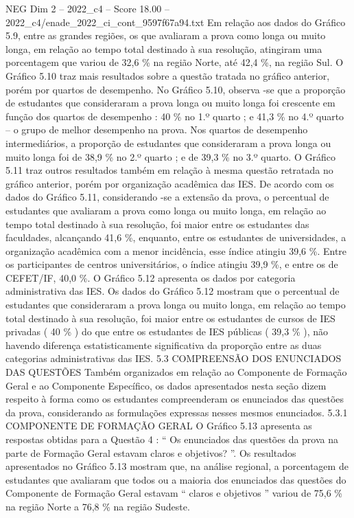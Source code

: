 \begin{textsample}{NEG Dim 2 – 2022\_c4 – Score 18.00 – 2022\_c4/enade\_2022\_ci\_cont\_9597f67a94.txt}
Em relação aos dados do Gráfico 5.9, entre as grandes regiões, os que avaliaram a prova como longa ou muito longa, em relação ao tempo total destinado à sua resolução, atingiram uma porcentagem que variou de 32,6 \% na região Norte, até 42,4 \%, na região Sul.
O Gráfico 5.10 traz mais resultados sobre a questão tratada no gráfico anterior, porém por quartos de desempenho.
No Gráfico 5.10, observa -se que a proporção de estudantes que consideraram a prova longa ou muito longa foi crescente em função dos quartos de desempenho : 40 \% no 1.º quarto ; e 41,3 \% no 4.º quarto – o grupo de melhor desempenho na prova.
Nos quartos de desempenho intermediários, a proporção de estudantes que consideraram a prova longa ou muito longa foi de 38,9 \% no 2.º quarto ; e de 39,3 \% no 3.º quarto.
O Gráfico 5.11 traz outros resultados também em relação à mesma questão retratada no gráfico anterior, porém por organização acadêmica das IES.
De acordo com os dados do Gráfico 5.11, considerando -se a extensão da prova, o percentual de estudantes que avaliaram a prova como longa ou muito longa, em relação ao tempo total destinado à sua resolução, foi maior entre os estudantes das faculdades, alcançando 41,6 \%, enquanto, entre os estudantes de universidades, a organização acadêmica com a menor incidência, esse índice atingiu 39,6 \%.
Entre os participantes de centros universitários, o índice atingiu 39,9 \%, e entre os de CEFET/IF, 40,0 \%.
O Gráfico 5.12 apresenta os dados por categoria administrativa das IES.
Os dados do Gráfico 5.12 mostram que o percentual de estudantes que consideraram a prova longa ou muito longa, em relação ao tempo total destinado à sua resolução, foi maior entre os estudantes de cursos de IES privadas ( 40 \% ) do que entre os estudantes de IES públicas ( 39,3 \% ), não havendo diferença estatisticamente significativa da proporção entre as duas categorias administrativas das IES. 5.3 COMPREENSÃO DOS ENUNCIADOS DAS QUESTÕES Também organizados em relação ao Componente de Formação Geral e ao Componente Específico, os dados apresentados nesta seção dizem respeito à forma como os estudantes compreenderam os enunciados das questões da prova, considerando as formulações expressas nesses mesmos enunciados. 5.3.1 COMPONENTE DE FORMAÇÃO GERAL O Gráfico 5.13 apresenta as respostas obtidas para a Questão 4 : “ Os enunciados das questões da prova na parte de Formação Geral estavam claros e objetivos? ”.
Os resultados apresentados no Gráfico 5.13 mostram que, na análise regional, a porcentagem de estudantes que avaliaram que todos ou a maioria dos enunciados das questões do Componente de Formação Geral estavam “ claros e objetivos ” variou de 75,6 \% na região Norte a 76,8 \% na região Sudeste.

\end{textsample}
